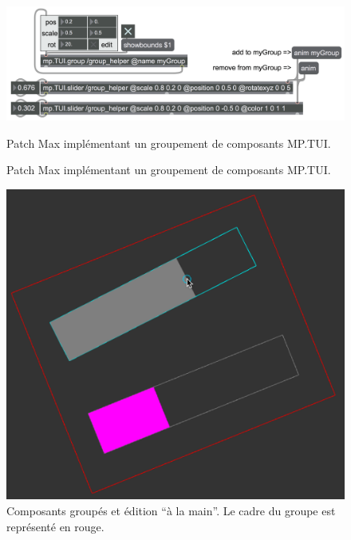 \begin{figure}[!htbp]
	\captionsetup{format=plain}%
	\centering
	\begin{minipage}[t]{0.48\textwidth}
		\includegraphics[width=\linewidth]{gfx/06_visual_representation/mpTUI_groups_patcher.png}
		\caption{Patch Max implémentant un groupement de composants MP.TUI.}{Patch Max implémentant un groupement de composants MP.TUI.}
		\label{fig:visual_representation:groups_patch}
	\end{minipage}
	\hspace{.02\linewidth}
	\begin{minipage}[t]{0.48\textwidth}
	    \includegraphics[width=\linewidth]{gfx/06_visual_representation/mpTUI_groups.png}
		\caption[Composants MP.TUI groupés]{Composants groupés et édition ``à la main''. Le cadre du groupe est représenté en rouge.}
		\label{fig:visual_representation:groups}
	\end{minipage}
\end{figure}

